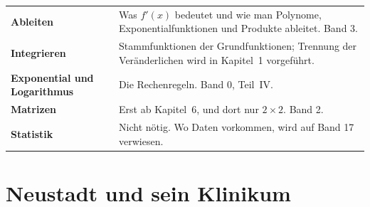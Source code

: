 \begin{merksatz}
\begin{center}
{\small
\renewcommand{\arraystretch}{1.5}
\begin{tabular}{@{}P{3.0cm}P{5.6cm}@{}}
\toprule
\textbf{Ableiten} & Was $f'(x)$ bedeutet und wie man Polynome, Exponentialfunktionen und Produkte ableitet. Band 3.\\
\textbf{Integrieren} & Stammfunktionen der Grundfunktionen; Trennung der Veränderlichen wird in Kapitel~1 vorgeführt.\\
\textbf{Exponential und Logarithmus} & Die Rechenregeln. Band 0, Teil~IV.\\
\textbf{Matrizen} & Erst ab Kapitel~6, und dort nur $2\times2$. Band 2.\\
\textbf{Statistik} & Nicht nötig. Wo Daten vorkommen, wird auf Band 17 verwiesen.\\
\bottomrule
\end{tabular}}
\end{center}

\begin{center}
\begin{minipage}{0.88\textwidth}
\end{minipage}
\end{center}
\end{merksatz}

\section*{Neustadt und sein Klinikum}

